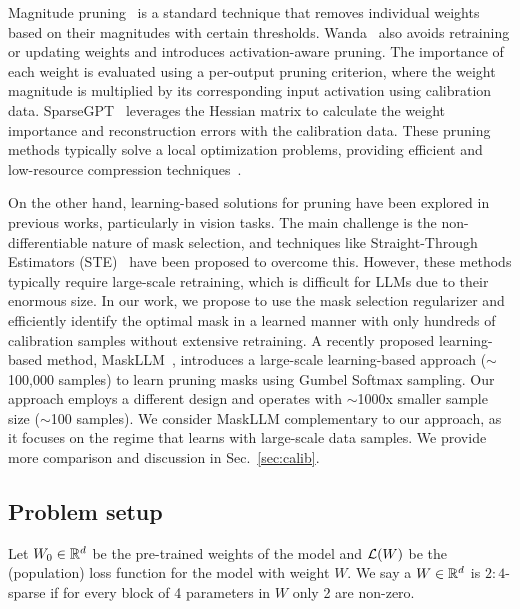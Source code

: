 Magnitude pruning~\cite{han2015deep} is a standard technique that removes individual weights based on their magnitudes with certain thresholds. Wanda~\cite{sun2023simple} also avoids retraining or updating weights and introduces activation-aware pruning. The importance of each weight is evaluated using a per-output pruning criterion, where the weight magnitude is multiplied by its corresponding input activation using calibration data. SparseGPT~\cite{frantar2023sparsegpt} leverages the Hessian matrix to calculate the weight importance and reconstruction errors with the calibration data. These pruning methods typically solve a local optimization problems, providing efficient and low-resource compression techniques~\cite{ma2023llm, frantar2023sparsegpt, frantar2022gptq, sun2023simple}.


On the other hand, learning-based solutions for pruning have been explored in previous works, particularly in vision tasks. The main challenge is the non-differentiable nature of mask selection, and techniques like Straight-Through Estimators (STE)~\cite{bengio2013estimating} have been proposed to overcome this. However, these methods typically require large-scale retraining, which is difficult for LLMs due to their enormous size. In our work, we propose to use the mask selection regularizer and efficiently identify the optimal mask in a learned manner with only hundreds of calibration samples without extensive retraining. A recently proposed learning-based method, MaskLLM~\cite{fang2024maskllm}, introduces a large-scale learning-based approach ($\sim$100,000 samples) to learn pruning masks using Gumbel Softmax sampling. Our approach employs a different design and operates with $\sim$1000x smaller sample size ($\sim$100 samples). We consider MaskLLM complementary to our approach, as it focuses on the regime that learns with large-scale data samples. We provide more comparison and discussion in Sec.~\ref{sec:calib}.



\vspace{-0.5em}

\subsection{Problem setup}
Let $W_0 \in\mathbb{R}^d$ be the pre-trained weights of the model and $\mathcal{L}(W)$ be the (population) loss function for the model with weight $W$. We say a $W\in \mathbb{R}^d$ is $2:4$-sparse if for every block of 4 parameters in $W$
only 2 are non-zero.
 
